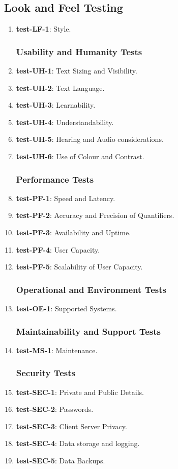 \documentclass[12pt, titlepage]{article}
\begin{document}
\subsection{Look and Feel Testing}
\begin{enumerate}
	\item{\textbf{test-LF-1}}: Style.
\subsubsection{Usability and Humanity Tests}
	\item{\textbf{test-UH-1}}: Text Sizing and Visibility.
	\item{\textbf{test-UH-2}}: Text Language.
	\item{\textbf{test-UH-3}}: Learnability.
	\item{\textbf{test-UH-4}}: Understandability.
	\item{\textbf{test-UH-5}}: Hearing and Audio considerations.
	\item{\textbf{test-UH-6}}: Use of Colour and Contrast.
\subsubsection{Performance Tests}
	\item{\textbf{test-PF-1}}: Speed and Latency.
	\item{\textbf{test-PF-2}}: Accuracy and Precision of Quantifiers.
	\item{\textbf{test-PF-3}}: Availability and Uptime.
	\item{\textbf{test-PF-4}}: User Capacity.
	\item{\textbf{test-PF-5}}: Scalability of User Capacity.
\subsubsection{Operational and Environment Tests}
	\item{\textbf{test-OE-1}}: Supported Systems.
\subsubsection{Maintainability and Support Tests}
	\item{\textbf{test-MS-1}}: Maintenance.
\subsubsection{Security Tests}
	\item{\textbf{test-SEC-1}}: Private and Public Details.
	\item{\textbf{test-SEC-2}}: Passwords.
	\item{\textbf{test-SEC-3}}: Client Server Privacy.
	\item{\textbf{test-SEC-4}}: Data storage and logging.
	\item{\textbf{test-SEC-5}}: Data Backups.
	

\end{enumerate}
\end{document}
